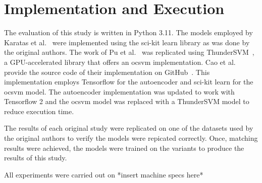 \section{Implementation and Execution}%
\label{sec:variants}

The evaluation of this study is written in Python 3.11. The models employed by
Karatas et al.~\cite{Karatas} were implemented using the
sci-kit learn library as was done by the original authors. The work
of Pu et al.~\cite{Pu} was replicated using ThunderSVM~\cite{ThunderSVM}, a
GPU-accelerated library that offers an \gls{ocsvm} implementation. Cao et
al.~\cite{Cao} provide the source code of their implementation on
GitHub~\cite{cao_git}. This implementation employs Tensorflow for the autoencoder and
sci-kit learn for the \gls{ocsvm} model. The autoencoder implementation was
updated to work with Tensorflow 2 and the \gls{ocsvm} model was replaced with a
ThunderSVM model to reduce execution time.

The results of each original study were replicated on one of the datasets used
by the original authors to verify the models were repicated correctly. Once,
matching results were achieved, the models were trained on the variants to
produce the results of this study.

All experiments were carried out on *insert machine specs here*

